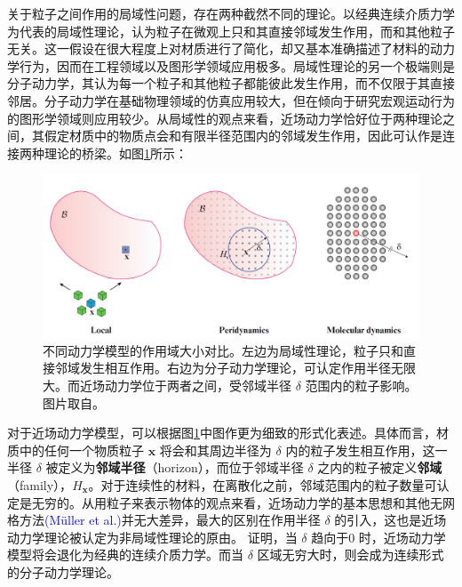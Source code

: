 关于粒子之间作用的局域性问题，存在两种截然不同的理论。以经典连续介质力学为代表的局域性理论，认为粒子在微观上只和其直接邻域发生作用，而和其他粒子无关。这一假设在很大程度上对材质进行了简化，却又基本准确描述了材料的动力学行为，因而在工程领域以及图形学领域应用极多。局域性理论的另一个极端则是分子动力学，其认为每一个粒子和其他粒子都能彼此发生作用，而不仅限于其直接邻居。分子动力学在基础物理领域的仿真应用较大，但在倾向于研究宏观运动行为的图形学领域则应用较少。从局域性的观点来看，近场动力学恰好位于两种理论之间，其假定材质中的物质点会和有限半径范围内的邻域发生作用，因此可认作是连接两种理论的桥梁。如图\ref{peridynamics_comparison}所示：

\begin{figure}[htbp!]
  \centering
  \captionsetup{justification=centering}
  \includegraphics[width=\linewidth]{chap/image/peridynamics_comparison}

  \caption{\label{peridynamics_comparison}
           不同动力学模型的作用域大小对比。左边为局域性理论，粒子只和直接邻域发生相互作用。右边为分子动力学理论，可认定作用半径无限大。而近场动力学位于两者之间，受邻域半径 $\delta$ 范围内的粒子影响。图片取自。
          }
\end{figure}

对于近场动力学模型，可以根据图\ref{peridynamics_comparison}中图作更为细致的形式化表述。具体而言，材质中的任何一个物质粒子 $\mathbf{x}$ 将会和其周边半径为 $\delta$ 内的粒子发生相互作用，这一半径 $\delta$ 被定义为\textbf{邻域半径}（horizon），而位于邻域半径 $\delta$ 之内的粒子被定义\textbf{邻域}（family），$H_\mathbf{x}$。对于连续性的材料，在离散化之前，邻域范围内的粒子数量可认定是无穷的。从用粒子来表示物体的观点来看，近场动力学的基本思想和其他无网格方法\textcolor{blue}{(M\"{u}ller et al.)\parencite{Muller2003}}并无大差异，最大的区别在作用半径 $\delta$ 的引入，这也是近场动力学理论被认定为非局域性理论的原由。 证明，当 $\delta$ 趋向于0 时，近场动力学模型将会退化为经典的连续介质力学。而当 $\delta$ 区域无穷大时，则会成为连续形式的分子动力学理论。

